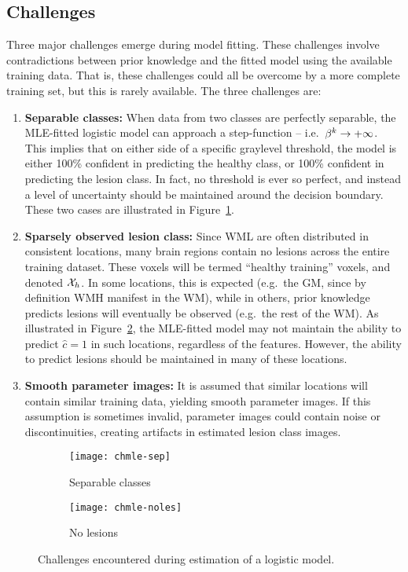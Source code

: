 \subsection{Challenges}\label{ss:vlr-chmle}
Three major challenges emerge during model fitting.
These challenges involve contradictions between prior knowledge
and the fitted model using the available training data.
That is, these challenges could all be overcome by a more complete training set,
but this is rarely available.
The three challenges are:
\begin{enumerate}
  \item\label{chmle:separable} \textbf{Separable classes:}
  When data from two classes are perfectly separable,
  the MLE-fitted logistic model can approach a step-function -- i.e.\ $\beta^k\rightarrow+\infty$.
  This implies that on either side of a specific graylevel threshold,
  the model is either 100\% confident in predicting the healthy class,
  or 100\% confident in predicting the lesion class.
  In fact, no threshold is ever so perfect,
  and instead a level of uncertainty should be maintained around the decision boundary.
  These two cases are illustrated in Figure~\ref{fig:chmle-sep}.
  \item\label{chmle:sparse} \textbf{Sparsely observed lesion class:}
  Since WML are often distributed in consistent locations,
  many brain regions contain no lesions across the entire training dataset.
  These voxels will be termed ``healthy training'' voxels, and denoted $\mathcal{X}_{h}$.
  In some locations, this is expected
  (e.g.\ the GM, since by definition WMH manifest in the WM),
  while in others, prior knowledge predicts lesions will eventually be observed
  (e.g.\ the rest of the WM).
  As illustrated in Figure~\ref{fig:chmle-noles},
  the MLE-fitted model may not maintain the ability to predict $\hat{c} = 1$ in such locations,
  regardless of the features.
  However, the ability to predict lesions should be maintained in many of these locations.
  \item\label{chmle:noisy} \textbf{Smooth parameter images:}
  It is assumed that similar locations will contain similar training data,
  yielding smooth parameter images.
  If this assumption is sometimes invalid,
  parameter images could contain noise or discontinuities,
  creating artifacts in estimated lesion class images.
\end{enumerate}
\begin{figure}
  \centering
  \begin{subfigure}{\plotwidth}
    \texttt{[image: chmle-sep]}
    \caption{Separable classes}%
    \label{fig:chmle-sep}
  \end{subfigure}
  \begin{subfigure}{\plotwidth}
    \texttt{[image: chmle-noles]}
    \caption{No lesions}%
     \label{fig:chmle-noles}
   \end{subfigure}
  \caption{Challenges encountered during estimation of a logistic model.}%
  \label{fig:chmle}
\end{figure}
